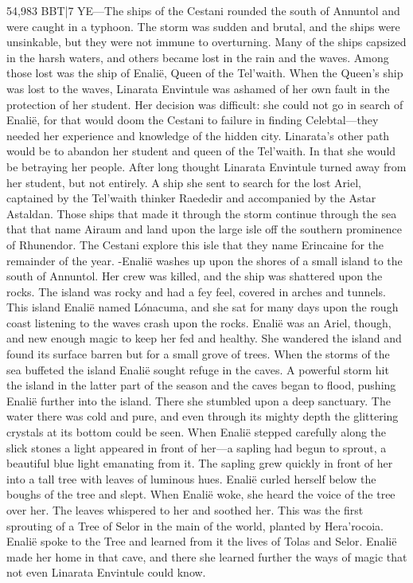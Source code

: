 \documentclass[smalldemyvopaper,11pt,twoside,onecolumn,openright,extrafontsizes]{memoir}
\begin{document}
{{54,983 BBT|7 YE—The ships of the Cestani rounded the south of Annuntol and were caught in a typhoon. The storm was sudden and brutal, and the ships were unsinkable, but they were not immune to overturning. Many of the ships capsized in the harsh waters, and others became lost in the rain and the waves. Among those lost was the ship of Enalië, Queen of the Tel’waith. When the Queen’s ship was lost to the waves, Linarata Envintule was ashamed of her own fault in the protection of her student. Her decision was difficult: she could not go in search of Enalië, for that would doom the Cestani to failure in finding Celebtal—they needed her experience and knowledge of the hidden city. Linarata’s other path would be to abandon her student and queen of the Tel’waith. In that she would be betraying her people. After long thought Linarata Envintule turned away from her student, but not entirely. A ship she sent to search for the lost Ariel, captained by the Tel’waith thinker Raededir and accompanied by the Astar Astaldan. Those ships that made it through the storm continue through the sea that that name Airaum and land upon the large isle off the southern prominence of Rhunendor. The Cestani explore this isle that they name Erincaine for the remainder of the year.
-Enalië washes up upon the shores of a small island to the south of Annuntol. Her crew was killed, and the ship was shattered upon the rocks. The island was rocky and had a fey feel, covered in arches and tunnels. This island Enalië named Lónacuma, and she sat for many days upon the rough coast listening to the waves crash upon the rocks. Enalië was an Ariel, though, and new enough magic to keep her fed and healthy. She wandered the island and found its surface barren but for a small grove of trees. When the storms of the sea buffeted the island Enalië sought refuge in the caves. A powerful storm hit the island in the latter part of the season and the caves began to flood, pushing Enalië further into the island. There she stumbled upon a deep sanctuary. The water there was cold and pure, and even through its mighty depth the glittering crystals at its bottom could be seen. When Enalië stepped carefully along the slick stones a light appeared in front of her—a sapling had begun to sprout, a beautiful blue light emanating from it. The sapling grew quickly in front of her into a tall tree with leaves of luminous hues. Enalië curled herself below the boughs of the tree and slept. When Enalië woke, she heard the voice of the tree over her. The leaves whispered to her and soothed her. This was the first sprouting of a Tree of Selor in the main of the world, planted by Hera’rocoia. Enalië spoke to the Tree and learned from it the lives of Tolas and Selor. Enalië made her home in that cave, and there she learned further the ways of magic that not even Linarata Envintule could know.

}}
\end{document}
